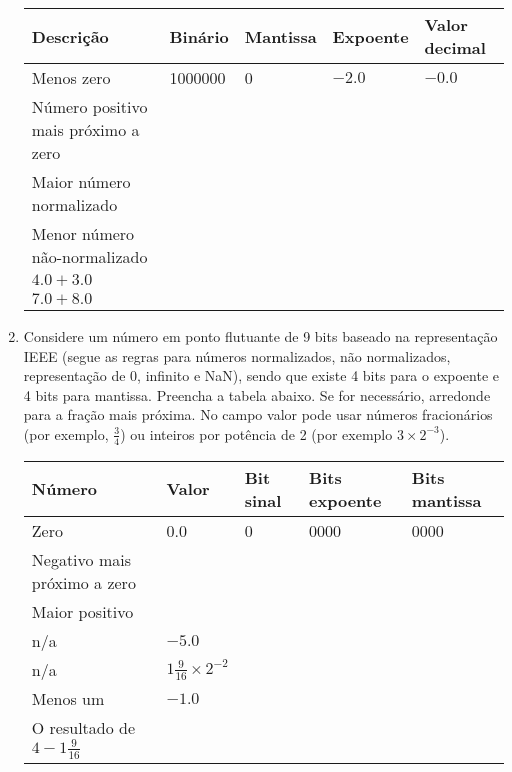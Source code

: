 \begin{enumerate}[resume]
    \begin{table}[H]
        \begin{tabular}{|l|l|l|l|l|}
            \hline
            \textbf{Descrição}  & 
            \textbf{Binário}    & 
            \textbf{Mantissa}   &
            \textbf{Expoente}   &
            \textbf{Valor decimal} \\\hline
            Menos zero & 1000000 & 0 & $-2.0$ & $-0.0$ \\\hline
            Número positivo mais próximo a zero & & & & \\\hline
            Maior número normalizado & & & & \\\hline
            Menor número não-normalizado & & & & \\\hline
            $4.0 + 3.0$ & & & & \\\hline
            $7.0 + 8.0$ & & & & \\
            \hline
        \end{tabular}
    \end{table}

    \item
    Considere um número em ponto flutuante de 9 bits 
    baseado na representação IEEE (segue as regras para números normalizados,
    não normalizados, representação de 0, infinito e NaN), sendo que 
    existe 4 bits para o expoente e 4 bits para mantissa.
    Preencha a tabela abaixo.
    Se for necessário, arredonde para a fração mais próxima.
    No campo valor pode usar números fracionários (por exemplo, $\frac{3}{4}$)
    ou inteiros por potência de 2 (por exemplo $3\times2^{-3}$).

    \begin{table}[H]
        \begin{tabular}{|l|l|l|l|l|}
            \hline
            \textbf{Número}  & 
            \textbf{Valor}    & 
            \textbf{Bit sinal}   &
            \textbf{Bits expoente}   &
            \textbf{Bits mantissa} \\\hline
            Zero & 0.0 & 0 & 0000 & 0000 \\\hline
            Negativo mais próximo a zero & & & & \\\hline
            Maior positivo & & & & \\\hline
            n/a & $-5.0$ & & & \\\hline
            n/a & $1\frac{9}{16}\times2^{-2}$ & & & \\\hline
            Menos um & $-1.0$ & & & \\\hline
            O resultado de $4-1\frac{9}{16}$ & & & & \\
            \hline
        \end{tabular}
    \end{table}


\end{enumerate}
